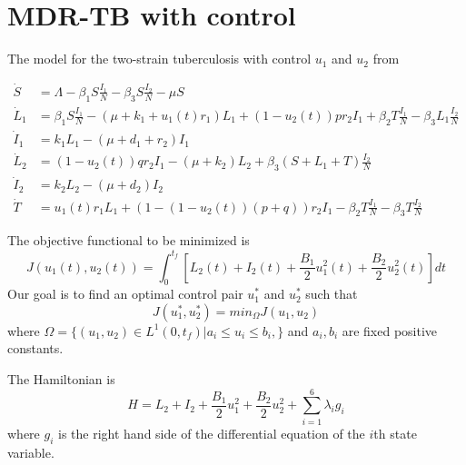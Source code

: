 \section{MDR-TB with control}  \label{Chap4-Sect2} 

The model for the two-strain tuberculosis with control $u_1$ and $u_2$
from {\citep{articleLenhart}}

\begin{align*}
	\dot{S}	&= 
    	\Lambda -\beta_{1} S \frac{I_1}{N} - \beta_{3}S\frac{I_2}{N} - 
        \mu S 
        \\
    \dot{L}_1 &= 
    	\beta_{1}S \frac{I_1}{N} - (\mu + k_1 + u_1(t)r_1)L_{1} + 
        (1 - u_2(t))pr_2 I_1 + \beta_{2} T \frac{I_1}{N} -
        \beta_{3} L_{1}\frac{I_2}{N}  
        \\
    \dot{I}_1 &=  
    	k_1 L_{1} - (\mu + d_1 + r_2)I_1  
        \\
    \dot{L}_2 &=  
    	(1 - u_2(t))q r_2 I_1 - (\mu + k_2)L_2 + \beta_{3}(S + L_1 + 
        T)\frac{I_2}{N}  
        \\
    \dot{I}_2 &=  
    	k_2 L_2 - (\mu + d_2)I_2  
        \\
    \dot{T} &=  
    	u_1(t)r_1 L_{1} + (1-(1-u_2(t))(p+q))r_2 I_1 - \beta_{2} T \frac{I_1}{N} - 
        \beta_{3}T\frac{I_2}{N}  
\end{align*}


The objective functional to be minimized is 
$$
    J(u_1(t),u_2(t)) = \int_{0}^{t_f} %
        \left[%
            L_2(t) + I_2(t) + \dfrac{B_1}{2} u_{1}^{2}(t) + \dfrac{B_2}{2} u_{2}^{2}(t)%
        \right] dt
$$
Our goal is to find an optimal control pair $u_{1}^{*}$ and $u_{2}^{*}$ such that
$$
    J(u_{1}^{*},u_{2}^{*}) = min_{\Omega}J(u_1,u_2)
$$
where $\Omega = \{(u_1,u_2) \in L^{1}(0, t_{f}) | a_i \leq u_i \leq b_i, \}$ and
$a_i , b_i$ are fixed positive constants. 

The Hamiltonian is
$$
    H = L_2 + I_2 + \dfrac{B_1}{2} u_{1}^{2} + \dfrac{B_2}{2} u_{2}^{2} +
        \sum_{i=1}^{6} \lambda_i g_i
$$
where $g_i$ is the right hand side of the differential equation of the $i$th
state variable.

